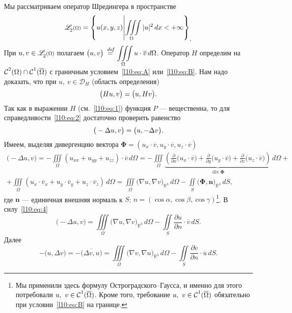 \documentclass[12pt,a4paper,openany,fleqn]{book}
\newcommand {\defeq}{\stackrel{\hspace{0.09 cm}de\!f}{=}}
\newcommand {\eqdef}{\defeq}
\newcommand{\R}{\ensuremath{\mathbb{R}}}
\newcommand{\Cf}{\ensuremath{\mathcal{C}}}
\newcommand{\mc}[1]{\ensuremath{\mathcal{#1}}}
\newcommand{\Cfn}[2][]{\ensuremath{\Cf{\mathstrut}^{#2}_{#1}}}
\newcommand{\pder}[2]{\ensuremath{\frac{\partial#1}{\partial#2}}}
\newcommand{\fL}[1][{[a,b]}]{\ensuremath{\mathscr{L}\hspace*{-0.11 cm}{\mathstrut}_{2}{\scriptstyle#1}}}
\DeclareMathOperator{\Div}{div}
\theoremstyle{definition}
\begin{document}
	Мы рассматриваем оператор Шредингера в пространстве 
	\begin{equation*}
		\hfill\fL[(\Omega)]=\left\{u(x,y,z)\middle|\iiint\limits_{\Omega}|u|^2\,dx<+\infty\right\}_{\displaystyle.}\hfill
	\end{equation*}
	При $u,v\in\fL[(\Omega)]$ полагаем $\displaystyle\big(u,v\big)\eqdef\iiint\limits_{\Omega}u\cdot\overline{v}\,d\Omega$. Оператор $H$ определим на $\Cfn{2}(\Omega)\cap\Cfn{1}(\overline{\Omega})$ с граничным условием~\eqref{l10:eq:A} или~\eqref{l10:eq:B}. Нам надо доказать, что при $u,\ v\in\mc{D}_{H}$ (область определения)
	\begin{equation}\label{l10:eq:2}
		\hfill\big(Hu,v\big)=\big(u,Hv\big).\hfill
	\end{equation}
	Так как в выражении $H$ (см.~\eqref{l10:eq:1}) функция $P$ --- вещественна, то для справедливости~\eqref{l10:eq:2} достаточно проверить равенство
	\begin{equation}\label{l10:eq:3}
			\hfill\big(-\Delta u,v\big)=\big(u,-\Delta v\big).\hfill
	\end{equation}
	Имеем, выделяя дивергенцию вектора $\bm{\Phi}=(u_x\cdot\overline{v},u_y\cdot\overline{v},u_z\cdot\overline{v})$
	\begin{multline}\label{l10:eq:4}
		\big(-\Delta u,v\big)=-\iiint\limits_{\Omega}(u_{xx}+u_{yy}+u_{zz})\cdot\overline{v}\,d\Omega=-\iiint\limits_{\Omega}\underbrace{\left(\pder{}{x}\big(u_x\cdot\overline{v}\big)+\pder{}{y}\big(u_y\cdot\overline{v}\big)+\pder{}{z}\big(u_z\cdot\overline{v}\big)\right)}_{\Div\bm{\Phi}}\,d\Omega+\\
		+\iiint\limits_{\Omega}(u_x\cdot\overline{v}_x+u_y\cdot\overline{v}_y+u_z\cdot\overline{v}_z)\,d\Omega=\iiint\limits_{\Omega}\big(\nabla u,\nabla v\big)_{\R^3}\,d\Omega-\iint\limits_{S}\big(\bm{\Phi},\bm{n}\big)_{\R^3}\,dS,
	\end{multline}
	где $\bm{n}$ --- единичная внешняя нормаль к $S$: $n=(\cos\alpha,\cos\beta,\cos\gamma)$\footnote{Мы применили здесь формулу Остроградского--Гаусса, и именно для этого потребовали $u,\ v\in\Cfn{1}(\overline{\Omega})$. Кроме того, требование $u,\ v\in\Cfn{1}(\overline{\Omega})$ обязательно при условии~\eqref{l10:eq:B} на границе.}. %
	В силу~\eqref{l10:eq:4}
	\begin{equation}\label{l10:eq:5}
		\big(-\Delta u,v\big)=\iiint\limits_{\Omega}\big(\nabla u,\nabla v\big)_{\R^3}\,d\Omega-\iint\limits_{S}\pder{u}{n}\cdot\overline{v}\,dS.
	\end{equation}
	Далее
	\begin{equation}\label{l10:eq:6}
		-\big(u,\Delta v\big)=-\overline{\big(\Delta v,u\big)}=\iiint\limits_{\Omega}\big(\nabla v,\nabla u\big)_{\R^3}\,d\Omega-\iint\limits_{S}\pder{\overline{v}}{n}\cdot\overline{u}\,dS.
	\end{equation}
\end{document}
